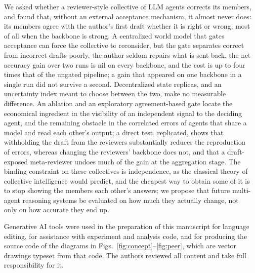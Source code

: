 \documentclass[manuscript, screen, review]{acmart}
\begin{document}
We asked whether a reviewer-style collective of LLM agents corrects its members, and found that, without an external acceptance mechanism, it almost never does: its members agree with the author's first draft whether it is right or wrong, most of all when the backbone is strong.
A centralized world model that gates acceptance can force the collective to reconsider, but the gate separates correct from incorrect drafts poorly, the author seldom repairs what is sent back, the net accuracy gain over two runs is nil on every backbone, and the cost is up to four times that of the ungated pipeline; a gain that appeared on one backbone in a single run did not survive a second.
Decentralized state replicas, and an uncertainty index meant to choose between the two, make no measurable difference.
An ablation and an exploratory agreement-based gate locate the economical ingredient in the visibility of an independent signal to the deciding agent, and the remaining obstacle in the correlated errors of agents that share a model and read each other's output; a direct test, replicated, shows that withholding the draft from the reviewers substantially reduces the reproduction of errors, whereas changing the reviewers' backbone does not, and that a draft-exposed meta-reviewer undoes much of the gain at the aggregation stage.
The binding constraint on these collectives is independence, as the classical theory of collective intelligence would predict, and the cheapest way to obtain some of it is to stop showing the members each other's answers; we propose that future multi-agent reasoning systems be evaluated on how much they actually change, not only on how accurate they end up.

\begin{acks}
Generative AI tools were used in the preparation of this manuscript for language editing, for assistance with experiment and analysis code, and for producing the source code of the diagrams in Figs.~\ref{fig:concept}--\ref{fig:peer}, which are vector drawings typeset from that code. The authors reviewed all content and take full responsibility for it.
\end{acks}



\end{document}
